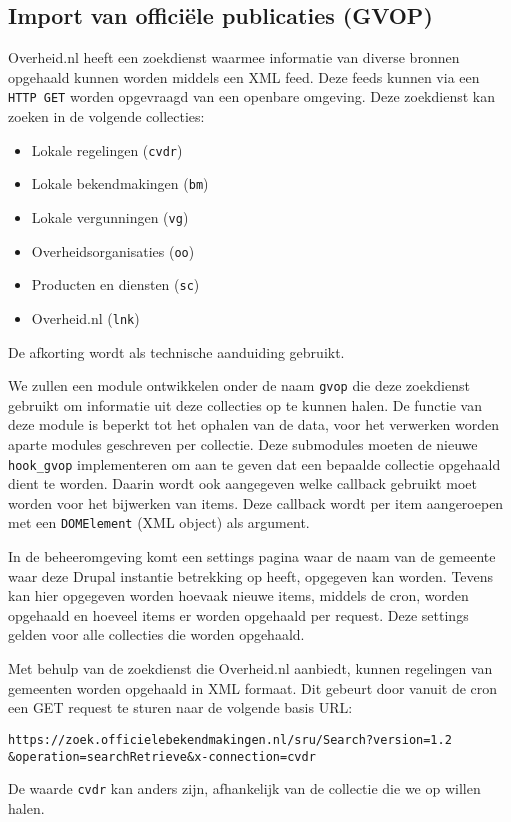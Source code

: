 \subsection{Import van offici\"{e}le publicaties (GVOP)}

Overheid.nl heeft een zoekdienst waarmee informatie van diverse bronnen opgehaald kunnen worden middels een XML feed. Deze feeds kunnen via een \texttt{HTTP GET} worden opgevraagd van een openbare omgeving. Deze zoekdienst kan zoeken in de volgende collecties:
\begin{itemize}
\item Lokale regelingen (\texttt{cvdr})
\item Lokale bekendmakingen (\texttt{bm})
\item Lokale vergunningen (\texttt{vg})
\item Overheidsorganisaties (\texttt{oo})
\item Producten en diensten (\texttt{sc})
\item Overheid.nl (\texttt{lnk})
\end{itemize}
De afkorting wordt als technische aanduiding gebruikt.

We zullen een module ontwikkelen onder de naam \texttt{gvop} die deze zoekdienst gebruikt om informatie uit deze collecties op te kunnen halen. De functie van deze module is beperkt tot het ophalen van de data, voor het verwerken worden aparte modules geschreven per collectie. Deze submodules moeten de nieuwe \texttt{hook\_gvop} implementeren om aan te geven dat een bepaalde collectie opgehaald dient te worden. Daarin wordt ook aangegeven welke callback gebruikt moet worden voor het bijwerken van items. Deze callback wordt per item aangeroepen met een \texttt{DOMElement} (XML object) als argument.

In de beheeromgeving komt een settings pagina waar de naam van de gemeente waar deze Drupal instantie betrekking op heeft, opgegeven kan worden. Tevens kan hier opgegeven worden hoevaak nieuwe items, middels de cron, worden opgehaald en hoeveel items er worden opgehaald per request. Deze settings gelden voor alle collecties die worden opgehaald.

Met behulp van de zoekdienst die Overheid.nl aanbiedt, kunnen regelingen van gemeenten worden opgehaald in XML formaat. Dit gebeurt door vanuit de cron een GET request te sturen naar de volgende basis URL:

\begin{verbatim}
https://zoek.officielebekendmakingen.nl/sru/Search?version=1.2
&operation=searchRetrieve&x-connection=cvdr
\end{verbatim}
De waarde \texttt{cvdr} kan anders zijn, afhankelijk van de collectie die we op willen halen.

